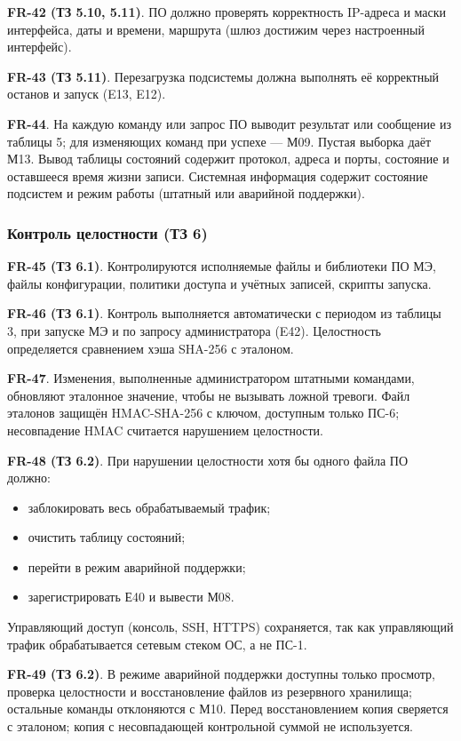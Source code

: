 \documentclass[13pt,a4paper,final]{article}
\begin{document}
	\textbf{FR-42 (ТЗ 5.10, 5.11)}. ПО должно проверять корректность IP-адреса и маски интерфейса, даты и времени, маршрута (шлюз достижим через настроенный интерфейс).
	
	\textbf{FR-43 (ТЗ 5.11)}. Перезагрузка подсистемы должна выполнять её корректный останов и запуск (E13, E12).
	
	\textbf{FR-44}. На каждую команду или запрос ПО выводит результат или сообщение из таблицы 5; для изменяющих команд при успехе — М09. Пустая выборка даёт М13. Вывод таблицы состояний содержит протокол, адреса и порты, состояние и оставшееся время жизни записи. Системная информация содержит состояние подсистем и режим работы (штатный или аварийной поддержки).
	
	\subsubsection{Контроль целостности (ТЗ 6)}
	
	\textbf{FR-45 (ТЗ 6.1)}. Контролируются исполняемые файлы и библиотеки ПО МЭ, файлы конфигурации, политики доступа и учётных записей, скрипты запуска.
	
	\textbf{FR-46 (ТЗ 6.1)}. Контроль выполняется автоматически с периодом из таблицы 3, при запуске МЭ и по запросу администратора (E42). Целостность определяется сравнением хэша SHA-256 с эталоном.
	
	\textbf{FR-47}. Изменения, выполненные администратором штатными командами, обновляют эталонное значение, чтобы не вызывать ложной тревоги. Файл эталонов защищён HMAC-SHA-256 с ключом, доступным только ПС-6; несовпадение HMAC считается нарушением целостности.
	
	\textbf{FR-48 (ТЗ 6.2)}. При нарушении целостности хотя бы одного файла ПО должно:
	\begin{itemize}
		\item заблокировать весь обрабатываемый трафик;
		\item очистить таблицу состояний;
		\item перейти в режим аварийной поддержки;
		\item зарегистрировать Е40 и вывести М08.
	\end{itemize}
	Управляющий доступ (консоль, SSH, HTTPS) сохраняется, так как управляющий трафик обрабатывается сетевым стеком ОС, а не ПС-1.
	
	\textbf{FR-49 (ТЗ 6.2)}. В режиме аварийной поддержки доступны только просмотр, проверка целостности и восстановление файлов из резервного хранилища; остальные команды отклоняются с М10. Перед восстановлением копия сверяется с эталоном; копия с несовпадающей контрольной суммой не используется.
	
\end{document}
